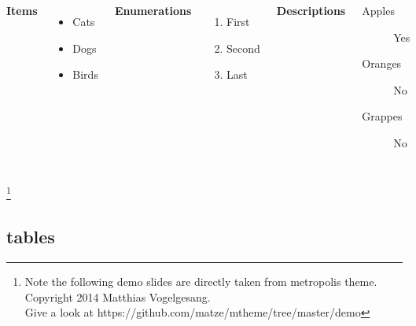 \documentclass[9pt,aspectratio=169]{ctexbeamer}
\begin{document}
\begin{frame}{\secname}{\subsecname}
   \begin{columns}[T,onlytextwidth]
      \textbf{Items}
      \begin{itemize}
        \item Cats \item Dogs \item Birds
      \end{itemize}

      \textbf{Enumerations}
      \begin{enumerate}
        \item First \item Second \item Last
      \end{enumerate}

      \textbf{Descriptions}
      \begin{description}
        \item[Apples] Yes \item[Oranges] No \item[Grappes] No
      \end{description}
\end{columns}
\let\thefootnote\relax\footnote{Note the following demo slides are directly taken from metropolis theme. Copyright 2014 Matthias Vogelgesang.\\
Give a look at https://github.com/matze/mtheme/tree/master/demo}
\end{frame}

\subsection{tables}
\end{document}
